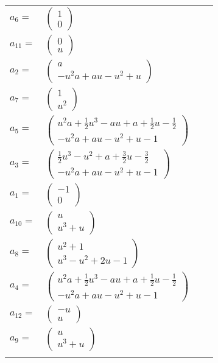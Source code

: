 \documentclass[1p]{elsarticle_modified}
\theoremstyle{definition}
\begin{document}
\begin{tabular}{m{7pt} m{180pt} m{7pt} m{180pt} }
\flushright $a_{6}=$&$\begin{pmatrix}1\\0\end{pmatrix}$ \\
\flushright $a_{11}=$&$\begin{pmatrix}0\\u\end{pmatrix}$ \\
\flushright $a_{2}=$&$\begin{pmatrix}a\\- u^2 a+a u- u^2+u\end{pmatrix}$ \\
\flushright $a_{7}=$&$\begin{pmatrix}1\\u^2\end{pmatrix}$ \\
\flushright $a_{5}=$&$\begin{pmatrix}u^2 a+\frac{1}{2} u^3- a u+a+\frac{1}{2} u-\frac{1}{2}\\- u^2 a+a u- u^2+u-1\end{pmatrix}$ \\
\flushright $a_{3}=$&$\begin{pmatrix}\frac{1}{2} u^3- u^2+a+\frac{3}{2} u-\frac{3}{2}\\- u^2 a+a u- u^2+u-1\end{pmatrix}$ \\
\flushright $a_{1}=$&$\begin{pmatrix}-1\\0\end{pmatrix}$ \\
\flushright $a_{10}=$&$\begin{pmatrix}u\\u^3+u\end{pmatrix}$ \\
\flushright $a_{8}=$&$\begin{pmatrix}u^2+1\\u^3- u^2+2 u-1\end{pmatrix}$ \\
\flushright $a_{4}=$&$\begin{pmatrix}u^2 a+\frac{1}{2} u^3- a u+a+\frac{1}{2} u-\frac{1}{2}\\- u^2 a+a u- u^2+u-1\end{pmatrix}$ \\
\flushright $a_{12}=$&$\begin{pmatrix}- u\\u\end{pmatrix}$ \\
\flushright $a_{9}=$&$\begin{pmatrix}u\\u^3+u\end{pmatrix}$\\&\end{tabular}
\end{document}

